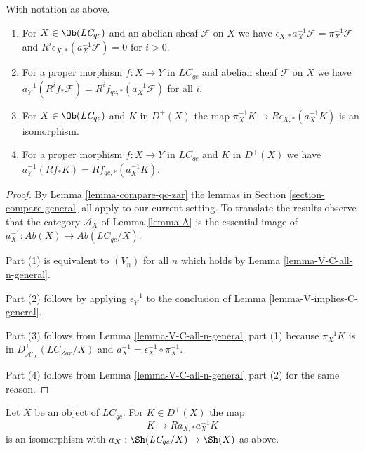 \begin{lemma}
\label{lemma-V-C-all-n}
With notation as above.
\begin{enumerate}
\item For $X \in \Ob(\textit{LC}_{qc})$ and an abelian sheaf $\mathcal{F}$
on $X$ we have $\epsilon_{X, *}a_X^{-1}\mathcal{F} = \pi_X^{-1}\mathcal{F}$
and $R^i\epsilon_{X, *}(a_X^{-1}\mathcal{F}) = 0$ for $i > 0$.
\item For a proper morphism $f : X \to Y$ in $\textit{LC}_{qc}$
and abelian sheaf $\mathcal{F}$ on $X$ we have
$a_Y^{-1}(R^if_*\mathcal{F}) = R^if_{qc, *}(a_X^{-1}\mathcal{F})$
for all $i$.
\item For $X \in \Ob(\textit{LC}_{qc})$ and $K$ in $D^+(X)$ the map
$\pi_X^{-1}K \to R\epsilon_{X, *}(a_X^{-1}K)$ is an isomorphism.
\item For a proper morphism $f : X \to Y$ in $\textit{LC}_{qc}$
and $K$ in $D^+(X)$ we have $a_Y^{-1}(Rf_*K) = Rf_{qc, *}(a_X^{-1}K)$.
\end{enumerate}
\end{lemma}

\begin{proof}
By Lemma \ref{lemma-compare-qc-zar} the lemmas in
Section \ref{section-compare-general} all apply to our current setting.
To translate the results
observe that the category $\mathcal{A}_X$ of Lemma \ref{lemma-A}
is the essential image of
$a_X^{-1} : \textit{Ab}(X) \to \textit{Ab}(\textit{LC}_{qc}/X)$.

\medskip\noindent
Part (1) is equivalent to $(V_n)$ for all $n$ which holds by
Lemma \ref{lemma-V-C-all-n-general}.

\medskip\noindent
Part (2) follows by applying $\epsilon_Y^{-1}$ to the conclusion of
Lemma \ref{lemma-V-implies-C-general}.

\medskip\noindent
Part (3) follows from Lemma \ref{lemma-V-C-all-n-general} part (1)
because $\pi_X^{-1}K$ is in $D^+_{\mathcal{A}'_X}(\textit{LC}_{Zar}/X)$
and $a_X^{-1} = \epsilon_X^{-1} \circ \pi_X^{-1}$.

\medskip\noindent
Part (4) follows from Lemma \ref{lemma-V-C-all-n-general} part (2)
for the same reason.
\end{proof}

\begin{lemma}
\label{lemma-cohomological-descent-LC}
Let $X$ be an object of $\textit{LC}_{qc}$. For $K \in D^+(X)$ the map
$$
K \longrightarrow Ra_{X, *}a_X^{-1}K
$$
is an isomorphism with $a_X : \Sh(\textit{LC}_{qc}/X) \to \Sh(X)$ as above.
\end{lemma}

